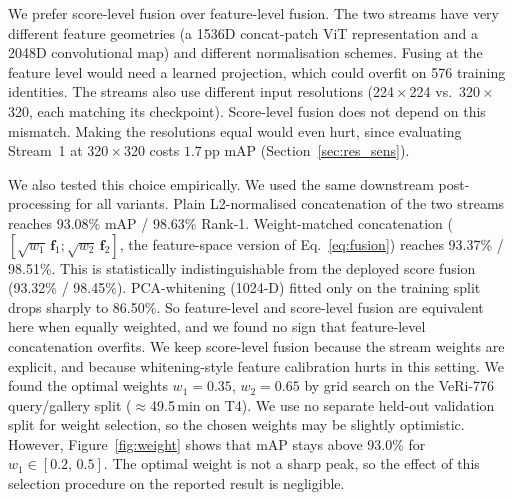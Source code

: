 We prefer score-level fusion over feature-level fusion. The two streams have very different feature geometries (a 1536D concat-patch ViT representation and a 2048D convolutional map) and different normalisation schemes. Fusing at the feature level would need a learned projection, which could overfit on 576 training identities. The streams also use different input resolutions (224\,$\times$\,224 vs.\ 320\,$\times$\,320, each matching its checkpoint). Score-level fusion does not depend on this mismatch. Making the resolutions equal would even hurt, since evaluating Stream~1 at 320\,$\times$\,320 costs $1.7$\,pp mAP (Section~\ref{sec:res_sens}).

We also tested this choice empirically. We used the same downstream post-processing for all variants. Plain L2-normalised concatenation of the two streams reaches 93.08\% mAP / 98.63\% Rank-1. Weight-matched concatenation ($[\sqrt{w_1}\,\mathbf{f}_1;\sqrt{w_2}\,\mathbf{f}_2]$, the feature-space version of Eq.~\eqref{eq:fusion}) reaches 93.37\% / 98.51\%. This is statistically indistinguishable from the deployed score fusion (93.32\% / 98.45\%). PCA-whitening (1024-D) fitted only on the training split drops sharply to 86.50\%. So feature-level and score-level fusion are equivalent here when equally weighted, and we found no sign that feature-level concatenation overfits. We keep score-level fusion because the stream weights are explicit, and because whitening-style feature calibration hurts in this setting. We found the optimal weights $w_1{=}0.35$, $w_2{=}0.65$ by grid search on the VeRi-776 query/gallery split ($\approx$49.5\,min on T4). We use no separate held-out validation split for weight selection, so the chosen weights may be slightly optimistic. However, Figure~\ref{fig:weight} shows that mAP stays above 93.0\% for $w_1 \in [0.2,\,0.5]$. The optimal weight is not a sharp peak, so the effect of this selection procedure on the reported result is negligible.
